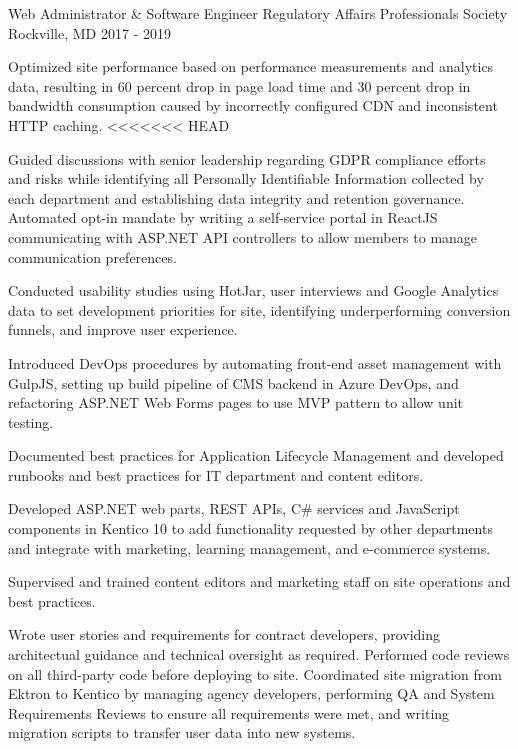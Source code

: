 \begin{cventries}
  \cventry
    {Web Administrator \& Software Engineer} %
    {Regulatory Affairs Professionals Society} %
    {Rockville, MD} %
    {2017 - 2019} %
    {
      \begin{cvitems} %
        \item {Optimized site performance based on performance measurements and analytics data, resulting in 60 percent drop in page load time and 30 percent drop in bandwidth consumption caused by incorrectly configured CDN and inconsistent HTTP caching.}
<<<<<<< HEAD
        \item {Guided discussions with senior leadership regarding GDPR compliance efforts and risks while identifying all Personally Identifiable Information collected by each department and establishing data integrity and retention governance. Automated opt-in mandate by writing a self-service portal in ReactJS communicating with ASP.NET API controllers to allow members to manage communication preferences.}
        \item {Conducted usability studies using HotJar, user interviews and Google Analytics data to set development priorities for site, identifying underperforming conversion funnels, and improve user experience.}
        \item {Introduced DevOps procedures by automating front-end asset management with GulpJS, setting up build pipeline of CMS backend in Azure DevOps, and refactoring ASP.NET Web Forms pages to use MVP pattern to allow unit testing.}
         \item {Documented best practices for Application Lifecycle Management and developed runbooks and best practices for IT department and content editors.}
         \item {Developed ASP.NET web parts, REST APIs, C\# services and JavaScript components in Kentico 10 to add functionality requested by other departments and integrate with marketing, learning management, and e-commerce systems.}
        \item {Supervised and trained content editors and marketing staff on site operations and best practices.}
        \item {Wrote user stories and requirements for contract developers, providing architectual guidance and technical oversight as required. Performed code reviews on all third-party code before deploying to site. Coordinated site migration from Ektron to Kentico by managing agency developers, performing QA and System Requirements Reviews to ensure all requirements were met, and writing migration scripts to transfer user data into new systems.}

\end{cvitems}}
\end{cventries}
